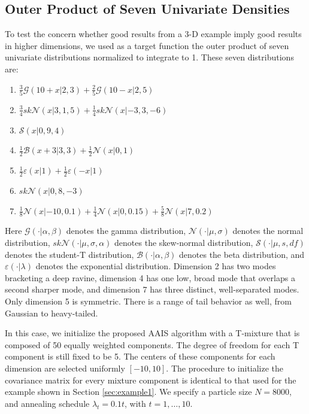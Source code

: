\subsection{ Outer Product of Seven Univariate Densities}
To test the concern whether good results from a 3-D example imply
good results in higher dimensions, we used as a target function the
outer product of seven univariate distributions normalized to
integrate to 1. These seven distributions are:
\begin{enumerate}
\item $\frac{3}{5}\mathcal{G}(10+x|2,3)+\frac{2}{5}\mathcal{G}(10-x|2,5)$
\item $\frac{3}{4}sk\mathcal{N}(x|3,1,5)+\frac{1}{4}sk\mathcal{N}(x|-3,3,-6)$
\item $\mathcal{S}(x|0,9,4)$
\item $\frac{1}{2}\mathcal{B}(x+3|3,3)+\frac{1}{2}\mathcal{N}(x|0,1)$
\item $\frac{1}{2}\varepsilon(x|1)+\frac{1}{2}\varepsilon(-x|1)$
\item $sk\mathcal{N}(x|0,8,-3)$
\item $\frac{1}{8}\mathcal{N}(x|-10,0.1)+\frac{1}{4}\mathcal{N}(x|0,0.15)+\frac{5}{8}\mathcal{N}(x|7,0.2)$
\end{enumerate}
Here $\mathcal{G}(\cdot|\alpha,\beta)$ denotes the gamma
distribution, $\mathcal{N}(\cdot|\mu,\sigma)$ denotes the normal
distribution, $sk\mathcal{N}(\cdot|\mu,\sigma,\alpha)$ denotes the
skew-normal distribution, $\mathcal{S}(\cdot|\mu,s,df)$ denotes the
student-T distribution, $\mathcal{B}(\cdot|\alpha,\beta)$ denotes
the beta distribution, and $\varepsilon(\cdot|\lambda)$ denotes the
exponential distribution. Dimension 2 has two modes bracketing a
deep ravine, dimension 4 has one low, broad mode that overlaps a
second sharper mode, and dimension 7 has three distinct,
well-separated modes. Only dimension 5 is symmetric. There is a
range of tail behavior as well, from Gaussian to heavy-tailed.

In this case, we initialize the proposed AAIS algorithm with a
T-mixture that is composed of 50 equally weighted components. The
degree of freedom for each T component is still fixed to be 5. The
centers of these components for each dimension are selected
uniformly $[-10,10]$. The procedure to initialize the covariance
matrix for every mixture component is identical to that used for the
example shown in Section \ref{sec:example1}. We specify a particle
size $N=8000$, and annealing schedule $\lambda_t=0.1t$, with
$t=1,\ldots,10$.

